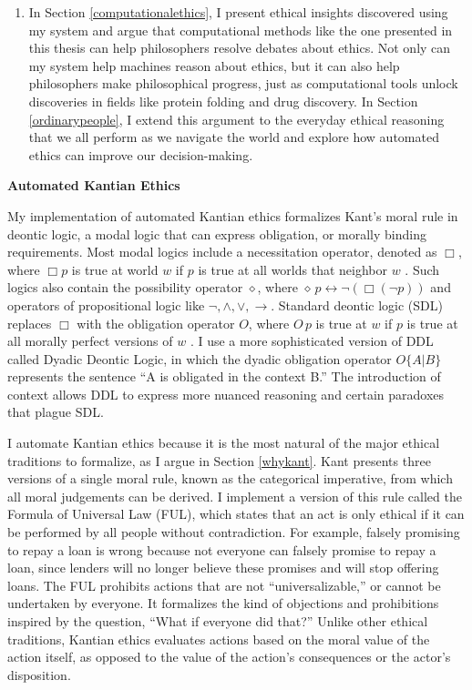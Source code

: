 \begin{isabellebody}
\begin{isamarkuptext}
\begin{enumerate}
\item In Section \ref{computationalethics}, I present ethical insights discovered using my system and argue that
computational methods like the one presented in this thesis can help philosophers resolve debates about ethics.
Not only can my system help machines reason about ethics, but it can also help philosophers make philosophical
progress, just as computational tools unlock discoveries in fields like protein folding and drug discovery.
In Section \ref{ordinarypeople}, I extend this argument to the everyday ethical reasoning that we all
perform as we navigate the world and explore how automated ethics can improve our decision-making. 
\end{enumerate}%
\end{isamarkuptext}\isamarkuptrue%
%
\begin{isamarkuptext}%
\noindent \textbf{Automated Kantian Ethics}

\medskip 

My implementation of automated Kantian ethics formalizes Kant's moral rule
in deontic logic, a modal logic that can express obligation, or morally binding requirements. Most modal 
logics include a necessitation operator, denoted as $\Box$, where
$\Box p$ is true at world $w$ if $p$ is true at all worlds that neighbor $w$ \citep{cresswell}. Such 
logics  also contain the possibility operator $\diamond$, where $\diamond \, p \longleftrightarrow \neg (\Box (\neg p))$ 
and operators of propositional logic like $\neg, \wedge, \vee, \rightarrow$. Standard deontic logic (SDL) 
replaces $\Box$ with the obligation operator $O$, where $O \, p$ is true at $w$ 
if $p$ is true at all morally perfect versions of $w$ \citep{sep-logic-deontic}. I use a more sophisticated
version of DDL called Dyadic Deontic Logic, in which
the dyadic obligation operator $O\{A \vert B\}$ represents the sentence ``A is obligated in the context B.'' 
The introduction of context allows DDL to express more nuanced reasoning and certain paradoxes that plague
SDL.

I automate Kantian ethics because it is the most natural of the major ethical traditions to formalize, as 
I argue in Section \ref{whykant}. 
Kant presents three versions of a single moral rule, known as the categorical imperative, from which 
all moral judgements can be derived. I implement a version of this rule called the Formula of Universal 
Law (FUL), which states that an act is only ethical if it can be performed by all people without contradiction. 
For example, falsely promising to repay a loan is wrong because not everyone can falsely promise to 
repay a loan, since lenders will no longer believe these promises and will stop offering loans. The FUL
prohibits actions that are not ``universalizable,'' or cannot be undertaken by everyone. It formalizes
the kind of objections and prohibitions inspired by the question, ``What if everyone did that?'' Unlike
other ethical traditions, Kantian ethics evaluates actions based on the moral value of the action itself, as opposed to
the value of the action's consequences or the actor's disposition.


\end{isamarkuptext}
\end{isabellebody}
